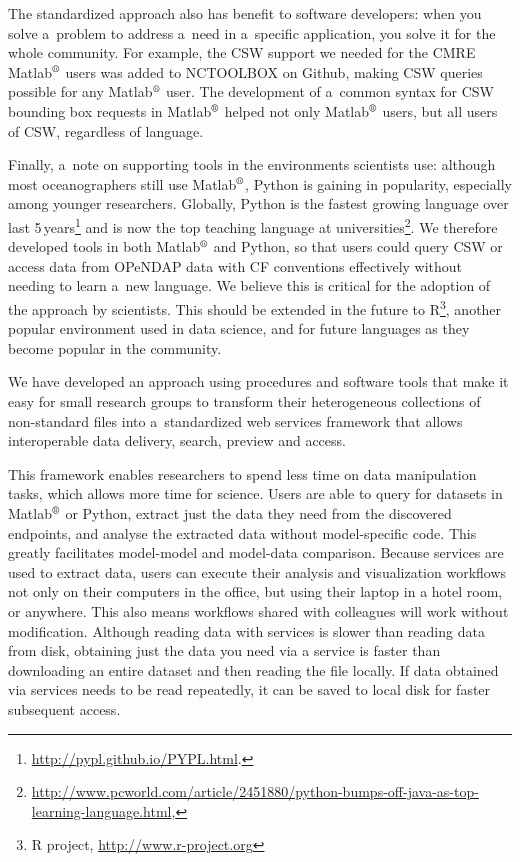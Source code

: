 \documentclass[osd, online, hvmath]{copernicus}
\begin{document}
The standardized approach also has benefit to software developers:
when you solve a~problem to address a~need in a~specific application,
you solve it for the whole community. For example, the CSW support we
needed for the CMRE Matlab$^{\text{\textregistered}}$ users was added
to NCTOOLBOX on Github, making CSW queries possible for any
Matlab$^{\text{\textregistered}}$ user.  The development of a~common
syntax for CSW bounding box requests in
Matlab$^{\text{\textregistered}}$ helped not only
Matlab$^{\text{\textregistered}}$ users, but all users of CSW,
regardless of language.

Finally, a~note on supporting tools in the environments scientists
use: although most oceanographers still use
Matlab$^{\text{\textregistered}}$, Python is gaining in popularity,
especially among younger researchers.  Globally, Python is the
fastest growing language over last
5\,\unit{years}\footnote{\url{http://pypl.github.io/PYPL.html}.} and
is now the top teaching language at
universities\footnote{\url{http://www.pcworld.com/article/2451880/python-bumps-off-java-as-top-learning-language.html},}.
We therefore developed tools in both Matlab$^{\text{\textregistered}}$
and Python, so that users could query CSW or access data from OPeNDAP
data with CF conventions effectively without needing to learn a~new
language. We believe this is critical for 
the adoption of the approach by
scientists. This should be extended in the future to R\footnote{R
  project, \url{http://www.r-project.org}}, another popular
environment used in data science, and for future languages as they
become popular in the community.




\conclusions

We have developed an approach using procedures and software tools that
make it easy for small research groups to transform their
heterogeneous collections of non-standard files into a~standardized web
services framework that allows interoperable data delivery, search,
preview and access.  

This framework enables researchers to spend less
time on data manipulation tasks, which allows more time for
science. Users are able to query for datasets in
Matlab$^{\text{\textregistered}}$ or Python, extract just the data
they need from the discovered endpoints, and analyse the extracted
data without model-specific code. This greatly facilitates model-model and model-data comparison.  Because services are used to extract data, users can execute their analysis and visualization workflows not only on their computers in the office, but using their laptop in a hotel room, or anywhere.  This also means workflows shared with colleagues will work without modification.  Although reading data with services is slower than reading data from disk, obtaining just the data you need via a service is faster than downloading an entire dataset and then reading the file locally. If data obtained via services needs to be read repeatedly, it can be saved to local disk for faster subsequent access. 
\end{document}
